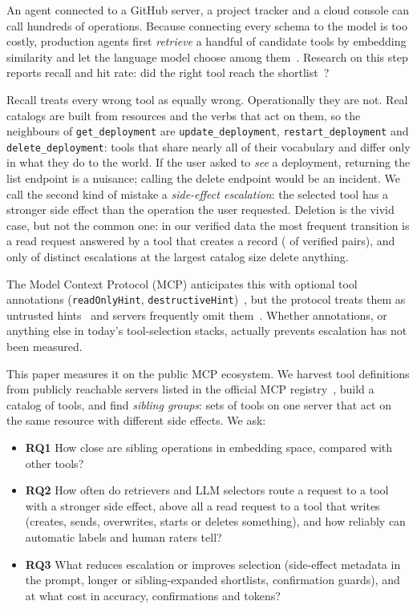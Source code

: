An agent connected to a GitHub server, a project tracker and a cloud console can call hundreds of
operations. Because connecting every schema to the model is too costly, production agents first
\emph{retrieve} a handful of candidate tools by embedding similarity and let the language model
choose among them~\cite{ragmcp,semdisc,scalemcp,mcpzero}. Research on this step reports
recall and hit rate: did the right tool reach the shortlist~\cite{toolret,toolrerank,livemcpbench}?

Recall treats every wrong tool as equally wrong. Operationally they are not. Real catalogs are
built from resources and the verbs that act on them, so the neighbours of
\texttt{get\_deployment} are \texttt{update\_deployment}, \texttt{restart\_deployment} and
\texttt{delete\_deployment}: tools that share nearly all of their vocabulary and differ only in
what they do to the world. If the user asked to \emph{see} a deployment, returning the list
endpoint is a nuisance; calling the delete endpoint would be an incident. We call the second kind of
mistake a \emph{side-effect escalation}: the selected tool has a stronger side effect than the
operation the user requested. Deletion is the vivid case, but not the common one: in our verified
data the most frequent transition is a read request answered by a tool that creates a record
(\EscTrueReadCreate{} of \EscTrue{} verified pairs), and only \EffDelete{} of \EffPairs{} distinct
escalations at the largest catalog size delete anything.

The Model Context Protocol (MCP) anticipates this with optional tool annotations
(\texttt{readOnlyHint}, \texttt{destructiveHint})~\cite{mcpspec}, but the protocol treats them as
untrusted hints~\cite{mcpannotations} and servers frequently omit them~\cite{randomdraw}. Whether
annotations, or anything else in today's tool-selection stacks, actually prevents escalation has
not been measured.

This paper measures it on the public MCP ecosystem. We harvest \NumRawTools{} tool definitions
from \NumRespondingServers{} publicly reachable servers listed in the official MCP
registry~\cite{mcpregistry}, build a catalog of \NumCatTools{} tools, and find
\NumSibGroups{} \emph{sibling groups}: sets of tools on one server that act on the same resource
with different side effects. We ask:

\begin{itemize}
\item \textbf{RQ1} How close are sibling operations in embedding space, compared with other tools?
\item \textbf{RQ2} How often do retrievers and LLM selectors route a request to a tool with a
stronger side effect, above all a read request to a tool that writes (creates, sends, overwrites, starts or
deletes something), and how reliably can
automatic labels and human raters tell?
\item \textbf{RQ3} What reduces escalation or improves selection (side-effect metadata in the
prompt, longer or sibling-expanded shortlists, confirmation guards), and at what cost in accuracy,
confirmations and tokens?
\end{itemize}

